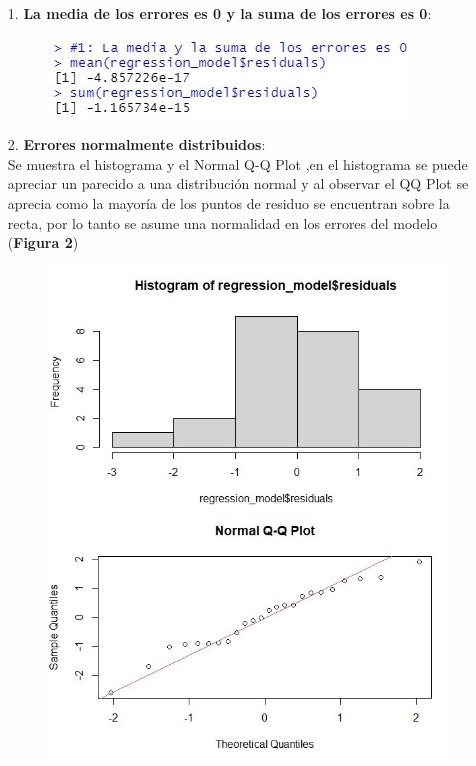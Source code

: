 \documentclass[a4paper,10pt,twocolumn]{article}
\begin{document}
\begin{enumerate}
	\item[1.] \textbf{La media de los errores es 0 y la suma de los errores es 0}:

\begin{figure}[h]
	\includegraphics[scale=0.8]{./imgs/reg_1.jpg}
\end{figure}
	
	\item[2.] \textbf{Errores normalmente distribuidos}:\\
	Se muestra el histograma y el Normal Q-Q Plot ,en el histograma se puede apreciar un parecido a una distribuci\'on normal y al observar el QQ Plot se aprecia como la mayoría de los puntos de residuo se encuentran sobre la recta, por lo tanto se asume una normalidad en los errores del modelo (\textbf{Figura 2})
	
	\begin{figure}[h]
		\includegraphics[scale=0.5]{./imgs/reg_2_hist.jpg}
		\includegraphics[scale=0.5]{./imgs/reg_2_qq.jpg}
		\caption{}
	\end{figure}
	

\end{enumerate}
\end{document}

